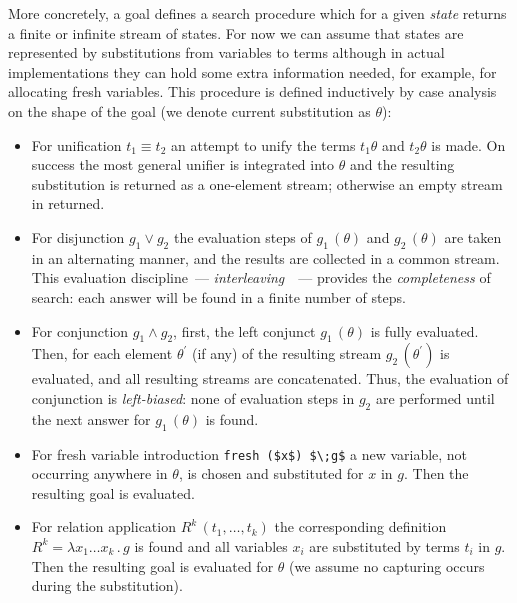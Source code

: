 More concretely, a goal defines a search procedure which for a given \emph{state} returns a finite or infinite stream of states. For now we can assume that states are represented by
substitutions from variables to terms although in actual implementations they can hold some extra information needed, for example, for allocating fresh variables.
This procedure is defined inductively by case analysis on the shape of the goal (we denote current substitution as $\theta$):

\begin{itemize}
\item For unification $t_1 \equiv t_2$ an attempt to unify the terms $t_1\theta$ and $t_2\theta$ is made. On success the most general unifier is integrated into $\theta$ and the resulting substitution
  is returned as a one-element stream; otherwise an empty stream in returned.

\item For disjunction $g_1 \vee g_2$ the evaluation steps of $g_1\,(\theta)$ and $g_2\,(\theta)$ are taken in an alternating manner, and the results are collected in a common stream. This evaluation
  discipline~--- \emph{interleaving}~\cite{fair:interleaving}~--- provides the \emph{completeness} of \mk search: each answer will be found in a finite number of steps.

\item For conjunction $g_1 \wedge g_2$, first, the left conjunct $g_1\,(\theta)$ is fully evaluated. Then, for each element $\theta^\prime$ (if any) of the resulting stream $g_2\,(\theta^\prime)$ is
  evaluated, and all resulting streams are concatenated. Thus, the evaluation of conjunction is \emph{left-biased}: none of evaluation steps in $g_2$ are performed until the next answer for
  $g_1\,(\theta)$ is found.

\item For fresh variable introduction \lstinline|fresh ($x$) $\;g$| a new variable, not occurring anywhere in $\theta$, is chosen and substituted for $x$ in $g$. Then the resulting goal is evaluated.

\item For relation application $R^k\,(t_1,\dots,t_k)$ the corresponding definition $R^k=\lambda x_1\dots x_k\,.\,g$ is found and all variables $x_i$ are substituted by terms $t_i$ in
  $g$. Then the resulting goal is evaluated for $\theta$ (we assume no capturing occurs during the substitution).
\end{itemize}

